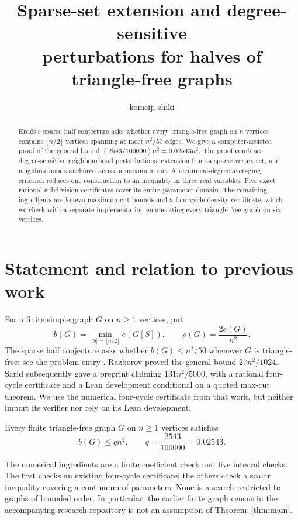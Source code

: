 \documentclass[12pt]{article}
\title{Sparse-set extension and degree-sensitive\\
perturbations for halves of triangle-free graphs}
\author{komeiji shiki}
\begin{document}
\maketitle
\begin{abstract}
Erd\H{o}s's sparse half conjecture asks whether every triangle-free graph
on $n$ vertices contains $\lfloor n/2\rfloor$ vertices spanning at most
$n^2/50$ edges. We give a computer-assisted proof of the general bound
$(2543/100000)n^2=0.02543n^2$. The proof combines degree-sensitive
neighbourhood perturbations, extension from a sparse vertex set, and
neighbourhoods anchored across a maximum cut. A reciprocal-degree averaging
criterion reduces one construction to an inequality in three real
variables. Five exact rational subdivision certificates cover its entire
parameter domain. The remaining ingredients are known maximum-cut bounds
and a four-cycle density certificate, which we check with a separate
implementation enumerating every triangle-free graph on six vertices.
\end{abstract}

\section{Statement and relation to previous work}
For a finite simple graph $G$ on $n\ge1$ vertices, put
\[
 b(G)=\min_{|S|=\lfloor n/2\rfloor}e(G[S]),\qquad
 \rho(G)=\frac{2e(G)}{n^2}.
\]
The sparse half conjecture asks whether $b(G)\le n^2/50$ whenever $G$ is
triangle-free; see the problem entry \cite{erdos}. Razborov \cite{razborov}
proved the general bound $27n^2/1024$. Sarid \cite{sarid} subsequently gave
a preprint claiming $131n^2/5000$, with a rational four-cycle certificate
and a Lean development conditional on a quoted max-cut theorem. We use
the numerical four-cycle certificate from that work, but neither import
its verifier nor rely on its Lean development.

\begin{theorem}\label{thm:main}
Every finite triangle-free graph $G$ on $n\ge1$ vertices satisfies
\[
 b(G)\le qn^2,\qquad q=\frac{2543}{100000}=0.02543.
\]
\end{theorem}

The numerical ingredients are a finite coefficient check and five
interval checks. The first checks an existing four-cycle certificate;
the others check a scalar inequality covering a continuum of parameters.
None is
a search restricted to graphs of bounded order. In particular, the earlier
finite graph census in the accompanying research repository is not an
assumption of Theorem~\ref{thm:main}.
\end{document}
